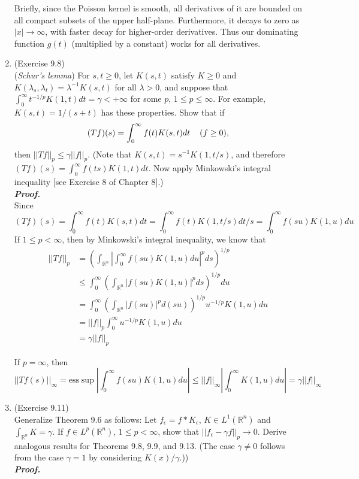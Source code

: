 \documentclass[a4paper,11pt]{article}
\begin{document}
\begin{enumerate}
		Briefly, since the Poisson kernel is smooth, all derivatives of it are bounded on all compact subsets of the upper half-plane. Furthermore, it decays to zero as $|x| \to \infty$, with faster decay for higher-order derivatives. Thus our dominating function $g(t)$ (multiplied by a constant) works for all derivatives.\\

	\item (Exercise 9.8)\\
		(\textit{Schur's lemma}) For $s, t \geq 0$, let $K(s,t)$ satisfy $K \geq 0$ and $K(\lambda_s, \lambda_t) = \lambda^{-1} K(s,t)$ for all $\lambda > 0$, and suppose that $\int_0^\infty t^{-1/p} K(1,t) dt = \gamma < +\infty$ for some $p$, $1 \leq p \leq \infty$. For example, $K(s,t) = 1/(s+t)$ has these properties. Show that if
			$$(Tf)(s) = \int_0^\infty f(t) K(s,t) dt \hspace{0.4cm} (f \geq 0),$$
		then $||Tf||_p \leq \gamma ||f||_p$. (Note that $K(s,t) = s^{-1} K(1, t/s)$, and therefore $(Tf)(s) = \int_0^\infty f(ts)K(1,t) dt$. Now apply Minkowski's integral inequality [see Exercise 8 of Chapter 8].)\\
	\newline
	\textit{\textbf {Proof.}}\\

		Since
			$$(Tf) (s)
			= \int_0^\infty f(t) K(s,t) dt
			= \int_0^\infty f(t) K(1,t/s) dt/s
			= \int_0^\infty f(su) K(1,u) du$$
		If $1 \leq p < \infty$, then by Minkowski's integral inequality, we know that
			$$\begin{aligned}
			||Tf||_p
			& = \left( \int_{\mathbb{R}^n} | \int_0^\infty f(su) K(1,u) du|^p ds \right)^{1/p}\\
			& \leq \int_0^\infty \left( \int_{\mathbb{R}^n} |f(su) K(1,u)|^p ds \right)^{1/p} du\\
			& = \int_0^\infty \left( \int_{\mathbb{R}^n} |f(su)|^p d(su) \right)^{1/p} u^{-1/p} K(1,u) du\\
			& = ||f||_p  \int_0^\infty u^{-1/p} K(1,u) du\\
			& = \gamma ||f||_p
			\end{aligned}$$

		If $p = \infty$, then
			$$||Tf(s)||_\infty
			= \text{ess} \sup \left| \int_0^\infty f(su) K(1,u) du \right|
			\leq ||f||_\infty \left| \int_0^\infty K(1,u) du \right|
			= \gamma ||f||_\infty$$


	\item (Exercise 9.11)\\
		Generalize Theorem 9.6 as follows: Let $f_\epsilon = f \ast K_\epsilon$, $K \in L^1(\mathbb{R}^n)$ and $\int_{\mathbb{R}^n} K = \gamma$. If $f \in L^p(\mathbb{R}^n)$, $1 \leq p < \infty$, show that $||f_\epsilon - \gamma f||_p \to 0$. Derive analogous results for Theorems 9.8, 9.9, and 9.13. (The case $\gamma \neq 0$ follows from the case $\gamma = 1$ by considering $K(x)/\gamma$.))\\
	\newline
	\textit{\textbf {Proof.}}\\


\end{enumerate}
\end{document}
